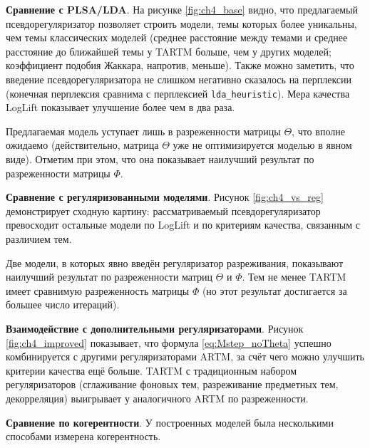 \textbf{Сравнение с PLSA/LDA}. На рисунке \ref{fig:ch4_base} видно, что предлагаемый псевдорегуляризатор позволяет строить модели, темы которых более уникальны, чем темы классических моделей (среднее расстояние между темами и среднее расстояние до ближайшей темы у TARTM больше, чем у других моделей; коэффициент подобия Жаккара, напротив, меньше). Также можно заметить, что введение псевдорегуляризатора не слишком негативно сказалось на перплексии (конечная перплексия сравнима с перплексией \texttt{lda\_heuristic}). Мера качества LogLift показывает улучшение более чем в два раза. 

 

Предлагаемая модель уступает лишь в разреженности матрицы $\Theta$, что вполне ожидаемо (действительно, матрица $\Theta$ уже не оптимизируется моделью в явном виде). Отметим при этом, что она показывает наилучший результат по разреженности матрицы $\Phi$. 

 

\textbf{Сравнение с регуляризованными моделями}. Рисунок \ref{fig:ch4_vs_reg} демонстрирует сходную картину: рассматриваемый псевдорегуляризатор превосходит остальные модели по LogLift и по критериям качества, связанным с различием тем. 

 

Две модели, в которых явно введён регуляризатор разреживания, показывают наилучший результат по разреженности матриц $\Theta$ и $\Phi$. Тем не менее TARTM имеет сравнимую разреженность матрицы $\Phi$ (но этот результат достигается за большее число итераций).  

 

\textbf{Взаимодействие с дополнительными регуляризаторами}. Рисунок \ref{fig:ch4_improved} показывает, что формула \ref{eq:Mstep_noTheta} успешно комбинируется с другими регуляризаторами ARTM, за счёт чего можно улучшить критерии качества ещё больше. TARTM с традиционным набором регуляризаторов (сглаживание фоновых тем, разреживание предметных тем, декорреляция) выигрывает у аналогичного ARTM по разреженности. 

 




 

\textbf{Сравнение по когерентности}. У построенных моделей была несколькими способами измерена когерентность.  

